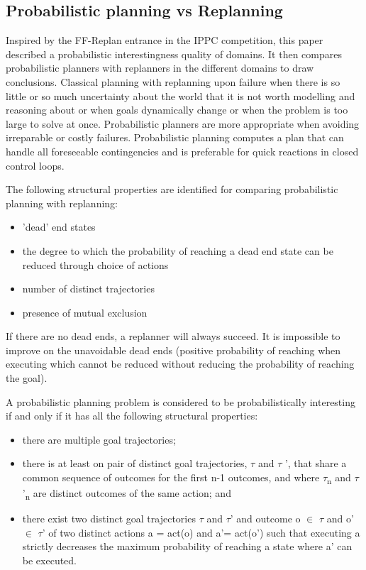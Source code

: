 \documentclass[runningheads,a4paper]{llncs}
\begin{document}
\subsection{Probabilistic planning vs Replanning}
Inspired by the FF-Replan entrance in the IPPC competition, this paper described a probabilistic interestingness quality of domains. It then compares probabilistic planners with replanners in the different domains to draw conclusions. Classical planning with replanning upon failure when there is so little or so much uncertainty about the world that it is not worth modelling and reasoning about or when goals dynamically change or when the problem is too large to solve at once. Probabilistic planners are more appropriate when avoiding irreparable or costly failures. Probabilistic planning computes a plan that can handle all foreseeable contingencies and is preferable for quick reactions in closed control loops.

The following structural properties are identified for comparing probabilistic planning with replanning:
\begin{itemize}
	\item 'dead' end states
	\item the degree to which the probability of reaching a dead end state can be reduced through choice of actions
	\item number of distinct trajectories
	\item presence of mutual exclusion
\end{itemize}

If there are no dead ends, a replanner will always succeed. It is impossible to improve on the unavoidable dead ends (positive probability of reaching when executing which cannot be reduced without reducing the probability of reaching the goal).


A probabilistic planning problem is considered to be probabilistically interesting if and only if it has all the following structural properties:

\begin{itemize}
	\item there are multiple goal trajectories;
	\item there is at least on pair of distinct goal trajectories, $\tau$ and $\tau$ ', that share a common sequence of outcomes for the first n-1 outcomes, and where $\tau$\textsubscript{n} and $\tau$'\textsubscript{n} are distinct outcomes of the same action; and
	\item there exist two distinct goal trajectories $\tau$ and $\tau$' and outcome o $\in$ $\tau$ and o' $\in$ $\tau$' of two distinct actions a = act(o) and a'= act(o') such that executing a strictly decreases the maximum probability of reaching a state where a' can be executed.
\end{itemize}
\end{document}
